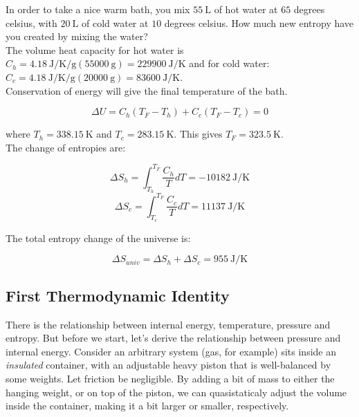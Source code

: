 \begin{texample}
	In order to take a nice warm bath, you mix $\SI{55}{\liter}$ of hot water at $65$ degrees celsius, with $\SI{20}{\liter}$ of cold water at $10$ degrees celsius. How much new entropy have you created by mixing the water? \\
	
	The volume heat capacity for hot water is $C_h=\SI{4.18}{\joule\per\kelvin\per\gram} (\SI{55000}{\gram})=\SI{229900}{\joule\per\kelvin}$ and for cold water: $C_{c}=\SI{4.18}{\joule\per\kelvin\per\gram} (\SI{20000}{\gram})=\SI{83600}{\joule\per\kelvin}$. \\
	
	Conservation of energy will give the final temperature of the bath.
	
	\[\Delta U=C_{h}(T_F-T_h)+C_{c}(T_F-T_c)=0\]
	
	where $T_h=\SI{338.15}{\kelvin}$ and $T_c=\SI{283.15}{\kelvin}$. This gives $T_F=\SI{323.5}{\kelvin}$. \\
	
	The change of entropies are:
	
	\[\Delta S_{h}=\int_{T_h}^{T_F} \frac{C_h}{T}dT=-\SI{10182}{\joule\per\kelvin}\]
	\[\Delta S_{c}=\int_{T_c}^{T_F} \frac{C_c}{T}dT=\SI{11137}{\joule\per\kelvin}\]
	
	The total entropy change of the universe is:
	
	\[\Delta S_{univ}=\Delta S_{h}+\Delta S_{c}=\SI{955}{\joule\per\kelvin}\]
\end{texample}

\subsection{First Thermodynamic Identity}

There is the relationship between internal energy, temperature, pressure and entropy. But before we start, let's derive the relationship between pressure and internal energy. Consider an arbitrary system (gas, for example) sits inside an \textit{insulated} container, with an adjustable heavy piston that is well-balanced by some weights. Let friction be negligible. By adding a bit of mass to either the hanging weight, or on top of the piston, we can quasistaticaly adjust the volume inside the container, making it a bit larger or smaller, respectively.

